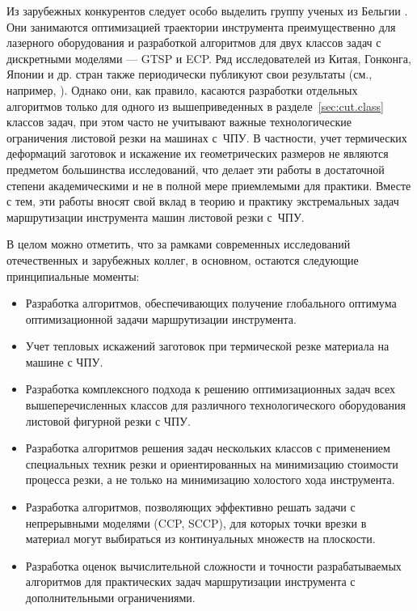 Из зарубежных конкурентов следует особо выделить группу ученых из Бельгии
\cite{bi:Dewil2014,bi:dewil-review,bi:Dewil2015Mar,bi:Dewil2015}.
Они занимаются
оптимизацией траектории инструмента преимущественно для лазерного оборудования и разработкой
алгоритмов для двух классов задач с дискретными моделями ---
GTSP и ECP.
Ряд исследователей из Китая, Гонконга,
Японии и др. стран также периодически публикуют свои результаты
(см., например,
\cite{bi:Kandasamy2020Mar,bi:Li2020Feb,bi:Vicencio,bi:Helsgaun2015Sep,bi:Ezzat2014Mar,bi:Ye2013,bi:Yun2013May,bi:VijayAnand2015Feb}).
Однако они, как правило,
касаются разработки отдельных алгоритмов только для одного из вышеприведенных в
разделе~\ref{sec:cut.class}
классов задач, при этом часто не учитывают важные технологические
ограничения листовой резки на машинах с~ЧПУ.
В частности, учет термических деформаций заготовок и искажение их
геометрических размеров не являются предметом большинства исследований,
что делает эти работы в достаточной степени академическими
и не в полной мере приемлемыми для практики.
Вместе с тем, эти работы вносят свой вклад в теорию и практику
экстремальных задач маршрутизации инструмента машин листовой резки с~ЧПУ.

В целом  можно отметить,
что за рамками современных исследований отечественных и зарубежных коллег,
в основном, остаются следующие принципиальные моменты:
\begin{itemize}
  \item
  Разработка алгоритмов, обеспечивающих получение глобального оптимума оптимизационной задачи маршрутизации инструмента.
  \item
  Учет тепловых искажений заготовок при термической резке материала на машине с ЧПУ.
  \item
  Разработка комплексного подхода к решению оптимизационных задач
  всех вышеперечисленных классов для различного технологического оборудования листовой фигурной резки с ЧПУ.
  \item
  Разработка алгоритмов решения задач нескольких классов
  с применением специальных техник резки и ориентированных на минимизацию стоимости процесса резки,
  а не только на минимизацию холостого хода инструмента.
  \item
  Разработка алгоритмов,
  позволяющих эффективно решать задачи с непрерывными моделями
  (CCP, SCCP),
  для которых точки врезки в материал могут выбираться из континуальных множеств на плоскости.
  \item
  Разработка оценок вычислительной сложности и точности
  разрабатываемых алгоритмов для практических задач маршрутизации инструмента
  с дополнительными ограничениями.
\end{itemize}

